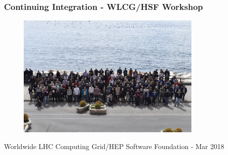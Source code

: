 \begin{frame}
\frametitle{Continuing Integration - WLCG/HSF Workshop}

\begin{figure}[htbp]
\begin{center}
\includegraphics[width=0.8\textwidth]{images/small-naples-group-photo.JPG}
\end{center}
\end{figure}

\begin{center}
\small{Worldwide LHC Computing Grid/HEP Software Foundation - Mar 2018}
\end{center}

\end{frame}


